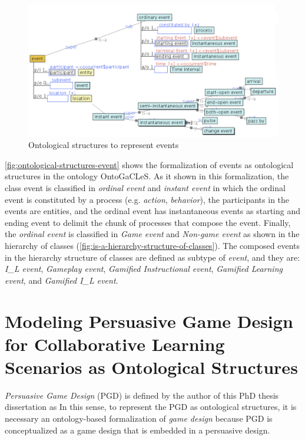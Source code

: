 \begin{figure}[!htb]
 \caption{Ontological structures to represent events}
 \label{fig:ontological-structures-event}
 \centering
 \includegraphics[width=1\textwidth]{images/chap-ontogacles2/ontological-structures-event.png}
 \fautor
\end{figure}

\autoref{fig:ontological-structures-event} shows the formalization of events as ontological structures in the ontology OntoGaCLeS. As it shown in this formalization, the class event is classified in \emph{ordinal event} and \emph{instant event} in which the ordinal event is constituted by a process (e.g. \emph{action}, \emph{behavior}), the participants in the events are entities, and the ordinal event has instantaneous events as starting and ending event to delimit the chunk of processes that compose the event. Finally, the \emph{ordinal event} is classified in \emph{Game event} and \emph{Non-game event} as shown in the  hierarchy of classes (\autoref{fig:is-a-hierarchy-structure-of-classes}). The composed events in the  hierarchy structure of classes are defined as subtype of \emph{event}, and they are: \emph{I\_L event}, \emph{Gameplay event}, \emph{Gamified Instructional event}, \emph{Gamified Learning event}, and \emph{Gamified I\_L event}.

\section[Modeling Persuasive Game Design for CL Scenarios as Ontological Structures]{Modeling Persuasive Game Design for Collaborative Learning Scenarios as Ontological Structures}
\label{sec:modeling-persuasive-game-design-gamification-cl-scenarios}

\emph{Persuasive Game Design} (PGD) is defined by the author of this PhD thesis dissertation as  In this sense, to represent the PGD as ontological structures, it is necessary an ontology-based formalization of \emph{game design} because PGD is conceptualized as a game design that is embedded in a persuasive design.

